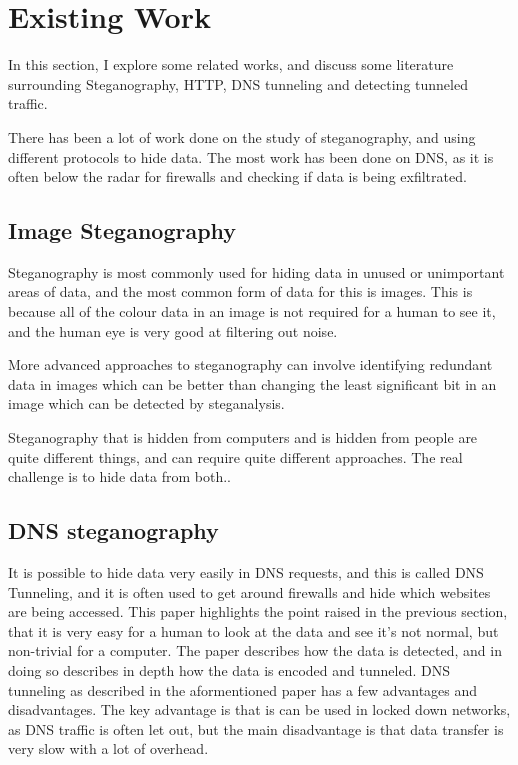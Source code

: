 \section{Existing Work}
In this section, I explore some related works, and discuss some literature surrounding Steganography, HTTP, DNS tunneling and detecting tunneled traffic.

There has been a lot of work done on the study of steganography, and using different protocols to hide data. The most work has been done on DNS, as it is often below the radar for firewalls and checking if data is being exfiltrated.
\subsection{Image Steganography}
Steganography is most commonly used for hiding data in unused or unimportant areas of data\cite{exploringsteno}, and the most common form of data for this is images. This is because all of the colour data in an image is not required for a human to see it, and the human eye is very good at filtering out noise\cite{exploringsteno}.

More advanced approaches to steganography can involve identifying redundant data in images\cite{introsteno} which can be better than changing the least significant bit in an image which can be detected by steganalysis\cite{introsteno}.

Steganography that is hidden from computers and is hidden from people are quite different things, and can require quite different approaches. The real challenge is to hide data from both.\cite{introsteno}.

\subsection{DNS steganography}
It is possible to hide data very easily in DNS requests, and this is called DNS Tunneling, and it is often used to get around firewalls and hide which websites are being accessed.\cite{detectingdns}
This paper highlights the point raised in the previous section, that it is very easy for a human to look at the data and see it's not normal, but non-trivial for a computer.
The paper describes how the data is detected, and in doing so describes in depth how the data is encoded and tunneled.
DNS tunneling as described in the aformentioned paper has a few advantages and disadvantages.
The key advantage is that is can be used in locked down networks, as DNS traffic is often let out, but the main disadvantage is that data transfer is very slow with a lot of overhead.

